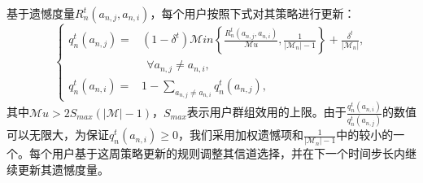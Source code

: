 基于遗憾度量$R_n^t(a_{n,j},a_{n,i})$，每个用户按照下式对其策略进行更新：
\vspace{-0.1cm}
\begin{equation}\label{eq:str2}
\begin{cases}
q^{t}_n(a_{n,j})=&(1-\delta^t)\mathcal{M}in\left\{\frac{R^t_n(a_{n,j},a_{n,i})}{\mathcal{M}u},\frac{1}{|\mathcal{M}_n|-1}\right\}+\frac{\delta^t}{|\mathcal{M}_n|},\\ &~~\forall a_{n,j}\neq a_{n,i}, \\
q^{t}_n(a_{n,i})=&1-\sum_{a_{n,j}\neq a_{n,i}}q^t_n(a_{n,j}),
\end{cases}
\end{equation}
其中$\mathcal{M}u>2S_{max}(|\mathcal{M}|-1)$，$S_{max}$表示用户群组效用的上限。由于$\frac{q^t_n(a_{n,i})}{q^t_n(a_{n,j})}$的数值可以无限大，为保证$q^{t}_n(a_{n,i})\geq0$，我们采用加权遗憾项和$\frac{1}{|\mathcal{M}_n|-1}$中的较小的一个。每个用户基于这周策略更新的规则调整其信道选择，并在下一个时间步长内继续更新其遗憾度量。


